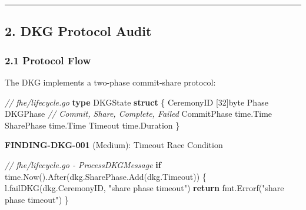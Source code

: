 \documentclass[
]{article}
\newenvironment{Shaded}{}{}
\newcommand{\CommentTok}[1]{\textcolor[rgb]{0.38,0.63,0.69}{\textit{#1}}}
\newcommand{\ControlFlowTok}[1]{\textcolor[rgb]{0.00,0.44,0.13}{\textbf{#1}}}
\newcommand{\DataTypeTok}[1]{\textcolor[rgb]{0.56,0.13,0.00}{#1}}
\newcommand{\DecValTok}[1]{\textcolor[rgb]{0.25,0.63,0.44}{#1}}
\newcommand{\KeywordTok}[1]{\textcolor[rgb]{0.00,0.44,0.13}{\textbf{#1}}}
\newcommand{\NormalTok}[1]{#1}
\newcommand{\OperatorTok}[1]{\textcolor[rgb]{0.40,0.40,0.40}{#1}}
\newcommand{\StringTok}[1]{\textcolor[rgb]{0.25,0.44,0.63}{#1}}
\begin{document}
\begin{center}\rule{0.5\linewidth}{0.5pt}\end{center}

\subsection{2. DKG Protocol Audit}\label{2-dkg-protocol-audit}

\subsubsection{2.1 Protocol Flow}\label{21-protocol-flow}

The DKG implements a two-phase commit-share protocol:

\begin{Shaded}
\begin{Highlighting}[]
\CommentTok{// fhe/lifecycle.go}
\KeywordTok{type}\NormalTok{ DKGState }\KeywordTok{struct} \OperatorTok{\{}
\NormalTok{    CeremonyID   }\OperatorTok{[}\DecValTok{32}\OperatorTok{]}\DataTypeTok{byte}
\NormalTok{    Phase        DKGPhase  }\CommentTok{// Commit, Share, Complete, Failed}
\NormalTok{    CommitPhase  time}\OperatorTok{.}\NormalTok{Time}
\NormalTok{    SharePhase   time}\OperatorTok{.}\NormalTok{Time}
\NormalTok{    Timeout      time}\OperatorTok{.}\NormalTok{Duration}
\OperatorTok{\}}
\end{Highlighting}
\end{Shaded}

\textbf{FINDING-DKG-001} (Medium): Timeout Race Condition

\begin{Shaded}
\begin{Highlighting}[]
\CommentTok{// fhe/lifecycle.go {-} ProcessDKGMessage}
\ControlFlowTok{if}\NormalTok{ time}\OperatorTok{.}\NormalTok{Now}\OperatorTok{().}\NormalTok{After}\OperatorTok{(}\NormalTok{dkg}\OperatorTok{.}\NormalTok{SharePhase}\OperatorTok{.}\NormalTok{Add}\OperatorTok{(}\NormalTok{dkg}\OperatorTok{.}\NormalTok{Timeout}\OperatorTok{))} \OperatorTok{\{}
\NormalTok{    l}\OperatorTok{.}\NormalTok{failDKG}\OperatorTok{(}\NormalTok{dkg}\OperatorTok{.}\NormalTok{CeremonyID}\OperatorTok{,} \StringTok{"share phase timeout"}\OperatorTok{)}
    \ControlFlowTok{return}\NormalTok{ fmt}\OperatorTok{.}\NormalTok{Errorf}\OperatorTok{(}\StringTok{"share phase timeout"}\OperatorTok{)}
\OperatorTok{\}}
\end{Highlighting}
\end{Shaded}
\end{document}
